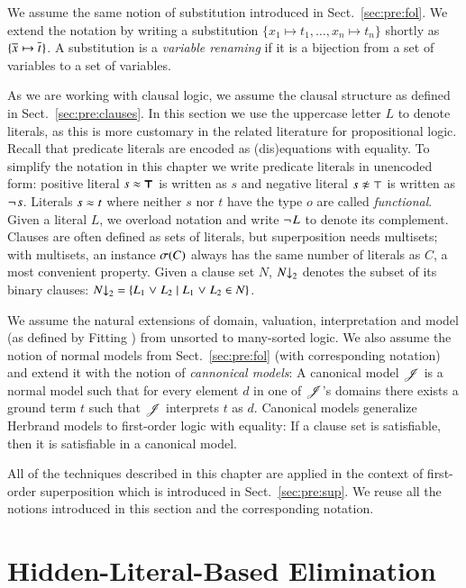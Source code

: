 We assume the same notion of substitution introduced in Sect.~\ref{sec:pre:fol}.
We extend the notation by writing a substitution $\{x_1 \mapsto t_1,
\ldots,\allowbreak x_n \mapsto t_n\}$ shortly as $\{ \overline{x}_{} \mapsto \overline{t}_{} \}$.
A substitution is a \emph{variable renaming} if it is a
bijection from a set of variables to a set of variables.


As we are working with clausal logic, we assume the clausal structure as defined
in Sect.~\ref{sec:pre:clauses}. In this section we use the uppercase letter $L$
to denote literals, as this is more customary in the related literature for
propositional logic. Recall that predicate literals  are encoded as
(dis)equations with equality. To simplify the notation in this chapter we write
predicate literals in unencoded form: positive literal $s \approx \pmb{\top}$ is
written as $s$ and negative literal $\neqlit{s}{\top}$ is written as
$\neg{\kern.2ex s}$. Literals $s \approx t$ where neither $s$ nor $t$ have the
type $o$ are called \emph{functional}. Given a literal $L$, we overload notation
and write $\neg{\kern.2ex L}$ to denote its complement. Clauses are often defined as
sets of literals, but superposition needs multisets; with multisets, an instance
$\sigma(C)$ always has the same number of literals as $C$, a most convenient
property. Given a clause set $N$, $N{\downarrow}_2$ denotes the subset of its binary
clauses: $N{\downarrow}_2 = \{ L_1 \mathrel{\lor} L_2 \mid L_1 \mathrel{\lor} L_2 \in N \}$.

We assume the natural extensions of domain, valuation, interpretation and model
(as defined by Fitting \cite{mf-1996-fol}) from unsorted to many-sorted logic.
We also assume the notion of normal models from Sect.~\ref{sec:pre:fol} (with
corresponding notation) and extend it with the notion of \emph{cannonical
models}: A canonical model $\mathscr{J}$ is a normal model such that for every
element $d$ in one of $\mathscr{J}$'s domains there exists a ground term $t$ such
that $\mathscr{J}$ interprets $t$ as $d$. Canonical models generalize Herbrand
models \cite{mf-1996-fol} to first-order logic with equality: If a clause set is satisfiable, then
it is satisfiable in a canonical model.

All of the techniques described in this chapter are applied in the context of
first-order superposition which is introduced in Sect.~\ref{sec:pre:sup}. We
reuse all the notions introduced in this section and the corresponding notation. 

\section{Hidden-Literal-Based Elimination}
\label{sec:satfol:hidden-literal-based-elimination}

